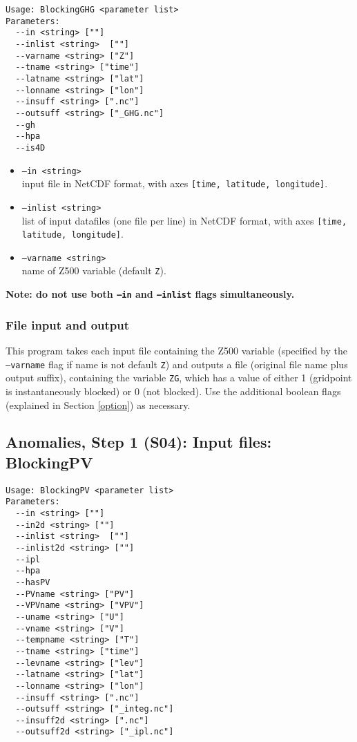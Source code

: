 \documentclass{article}
\begin{document}
\begin{verbatim}
Usage: BlockingGHG <parameter list>
Parameters:
  --in <string> [""]
  --inlist <string>  [""]
  --varname <string> ["Z"]
  --tname <string> ["time"]
  --latname <string> ["lat"]
  --lonname <string> ["lon"]
  --insuff <string> [".nc"]
  --outsuff <string> ["_GHG.nc"]
  --gh
  --hpa
  --is4D
\end{verbatim}

\begin{itemize}
\item[]\texttt{--in <string>} \\ input file in NetCDF format, with axes \texttt{[time, latitude, longitude]}. 
\item[]\texttt{--inlist <string>}\\ list of input datafiles (one file per line) in NetCDF format, with axes \texttt{[time, latitude, longitude]}. 
\item[] \texttt{--varname <string>}\\ name of Z500 variable (default \texttt{Z}).
\end{itemize}

\textbf{Note: do not use both \texttt{--in} and \texttt{--inlist} flags simultaneously.}


\subsubsection{File input and output}


This program takes each input file containing the Z500 variable (specified by the \texttt{--varname} flag if name is not default \texttt{Z}) and outputs a file (original file name plus output suffix), containing the variable \texttt{ZG}, which has a value of either 1 (gridpoint is instantaneously blocked) or 0 (not blocked). Use the additional boolean flags (explained in Section \ref{option}) as necessary.





\subsection{Anomalies, Step 1 (S04): Input files: BlockingPV}\label{PV}
\begin{verbatim}
Usage: BlockingPV <parameter list>
Parameters:
  --in <string> [""]
  --in2d <string> [""]
  --inlist <string>  [""]
  --inlist2d <string> [""]
  --ipl
  --hpa
  --hasPV
  --PVname <string> ["PV"]
  --VPVname <string> ["VPV"]
  --uname <string> ["U"]
  --vname <string> ["V"]
  --tempname <string> ["T"]
  --tname <string> ["time"]
  --levname <string> ["lev"]
  --latname <string> ["lat"]
  --lonname <string> ["lon"]
  --insuff <string> [".nc"]
  --outsuff <string> ["_integ.nc"]
  --insuff2d <string> [".nc"]
  --outsuff2d <string> ["_ipl.nc"]
\end{verbatim}
\end{document}
